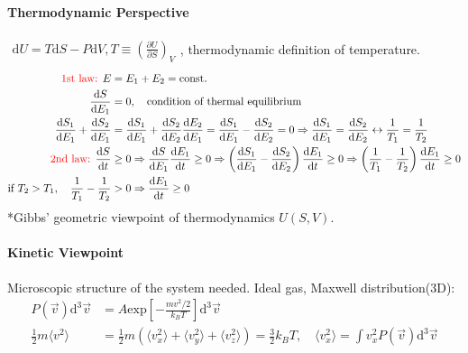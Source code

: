 \documentclass[../../main.tex]{subfiles}
\begin{document}
\paragraph{Thermodynamic Perspective} 
    $\begin{aligned}
        \mathrm{d}U = T\mathrm{d}S - P\mathrm{d}V, T \equiv \left(\frac{\partial U}{\partial S}\right)_{V}
    \end{aligned}$, thermodynamic definition of temperature.
    \begin{align*}
        {\color{red}{\text{1st law: }}}E &= E_{1} + E_{2} = \text{const.}\\
        \frac{\mathrm{d}S}{\mathrm{d}E_{1}} &= 0,\quad \text{condition of thermal equilibrium}\\
        \frac{\mathrm{d}S_{1}}{\mathrm{d}E_{1}} + \frac{\mathrm{d}S_{2}}{\mathrm{d}E_{1}} &= \frac{\mathrm{d}S_{1}}{\mathrm{d}E_{1}} + \frac{\mathrm{d}S_{2}}{\mathrm{d}E_{2}}\frac{\mathrm{d}E_{2}}{\mathrm{d}E_{1}} = \frac{\mathrm{d}S_{1}}{\mathrm{d}E_{1}} - \frac{\mathrm{d}S_{2}}{\mathrm{d}E_{2}} = 0\Rightarrow \frac{\mathrm{d}S_{1}}{\mathrm{d}E_{1}} = \frac{\mathrm{d}S_{2}}{\mathrm{d}E_{2}}\leftrightarrow\frac{1}{T_{1}} = \frac{1}{T_{2}}\\
        {\color{red}{\text{2nd law: }}}\frac{\mathrm{d}S}{\mathrm{d}t}&\geq 0\Rightarrow
        \frac{\mathrm{d}S}{\mathrm{d}E_{1}}\frac{\mathrm{d}E_{1}}{\mathrm{d}t}\geq 0\Rightarrow 
        \left(\frac{\mathrm{d}S_{1}}{\mathrm{d}E_{1}}-\frac{\mathrm{d}S_{2}}{\mathrm{d}E_{2}}\right)\frac{\mathrm{d}E_{1}}{\mathrm{d}t}\geq 0\Rightarrow
        \left(\frac{1}{T_{1}} - \frac{1}{T_{2}}\right)\frac{\mathrm{d}E_{1}}{\mathrm{d}t}\geq 0\\
        \text{if }T_{2}>T_{1},\quad \frac{1}{T_{1}} - \frac{1}{T_{2}} &> 0\Rightarrow \frac{\mathrm{d}E_{1}}{\mathrm{d}t}\geq 0
    \end{align*}
    *Gibbs' geometric viewpoint of thermodynamics $U(S,V)$.
\paragraph{Kinetic Viewpoint}
Microscopic structure of the system needed. Ideal gas, Maxwell distribution(3D): 
    \begin{align*}
        P(\vec{v})\mathrm{d}^{3}\vec{v} &= A\text{exp}\left[-\frac{mv^{2}/2}{k_{B}T}\right]\mathrm{d}^{3}\vec{v}\\
        \frac{1}{2}m\langle v^{2}\rangle &= \frac{1}{2}m\left(\langle v_{x}^{2}\rangle + \langle v_{y}^{2}\rangle + \langle v_{z}^{2}\rangle\right)= \frac{3}{2}k_{B}T,\quad\langle v_{x}^{2}\rangle = \int v_{x}^{2}P(\vec{v})\mathrm{d}^{3}\vec{v}
    \end{align*}
\end{document}
